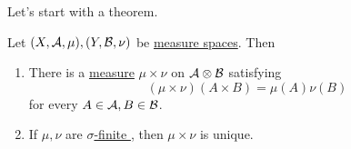 Let's start with a theorem.
\begin{theorem}
	Let \((X, \mathcal{\MakeUppercase{a}} , \mu ), (Y, \mathcal{\MakeUppercase{b}} , \nu )\) be \hyperref[def:measure-space]{measure spaces}. Then
	\begin{enumerate}
		\item There is a \hyperref[def:measure]{measure} \(\mu \times \nu \) on \(\mathcal{\MakeUppercase{a}} \otimes \mathcal{\MakeUppercase{b}} \) satisfying
		      \[
			      (\mu \times \nu )(A\times B) = \mu (A)\nu (B)
		      \]
		      for every \(A\in \mathcal{\MakeUppercase{a}} , B\in \mathcal{\MakeUppercase{b}} \).
		\item If \(\mu , \nu \) are \hyperref[def:finite-measure]{\(\sigma\)-finite }, then \(\mu \times \nu \) is unique.
	\end{enumerate}
\end{theorem}
